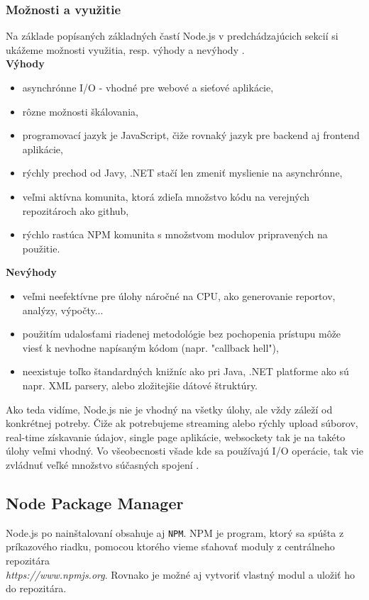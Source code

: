 \subsubsection{Možnosti a využitie}
Na základe popísaných základných častí Node.js v predchádzajúcich sekcií si ukážeme možnosti využitia, resp. výhody a nevýhody \cite{nodejs-arch}.\\

\noindent \textbf{Výhody}
\begin{itemize}
\item asynchrónne I/O - vhodné pre webové a sieťové aplikácie,
\item rôzne možnosti škálovania,
\item programovací jazyk je JavaScript, čiže rovnaký jazyk pre backend aj frontend aplikácie,
\item rýchly prechod od Javy, .NET stačí len zmeniť myslienie na asynchrónne,
\item veľmi aktívna komunita, ktorá zdieľa množstvo kódu na verejných repozitároch ako github,
\item rýchlo rastúca NPM komunita s množstvom modulov pripravených na použitie.
\end{itemize}

\noindent \textbf{Nevýhody}
\begin{itemize}
\item veľmi neefektívne pre úlohy náročné na CPU, ako generovanie reportov, analýzy, výpočty...
\item použitím udalosťami riadenej metodológie bez pochopenia prístupu môže viesť k nevhodne napísaným kódom (napr. "callback hell"),
\item neexistuje toľko štandardných knižníc ako pri Java, .NET platforme ako sú napr. XML parsery, alebo zložitejšie dátové štruktúry.
\end{itemize}

Ako teda vidíme, Node.js nie je vhodný na všetky úlohy, ale vždy záleží od konkrétnej potreby. Čiže ak potrebujeme streaming alebo rýchly upload súborov, real-time získavanie údajov, single page aplikácie, websockety tak je na takéto úlohy veľmi vhodný. Vo všeobecnosti všade kde sa používajú I/O operácie, tak vie zvládnuť veľké množstvo súčasných spojení \cite{nodejs-introduction}.

\subsection{Node Package Manager}
Node.js po nainštalovaní obsahuje aj \verb|NPM|. NPM je program, ktorý sa spúšta z príkazového riadku, pomocou ktorého vieme sťahovať moduly z centrálneho repozitára\\ \textit{https://www.npmjs.org}. Rovnako je možné aj vytvoriť vlastný modul a uložiť ho do repozitára.

